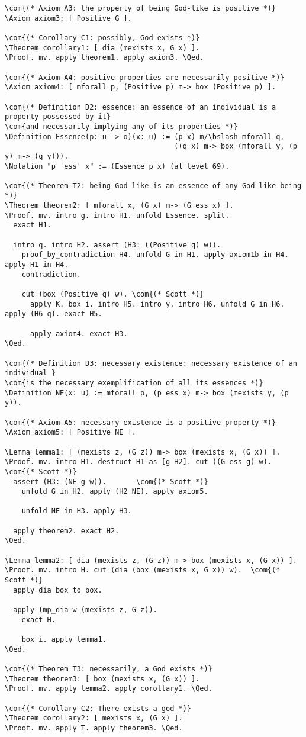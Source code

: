 \documentclass{llncs}
\newcommand{\red}[1]{\textcolor[rgb]{1,0,0}{#1}}
\newcommand{\blue}[1]{\textcolor[rgb]{0,0,1}{#1}}
\newcommand{\brown}[1]{\textcolor[rgb]{0.8,0.6,0.4}{#1}}
\newcommand{\Axiom}{\red{Axiom}}
\newcommand{\Lemma}{\red{Lemma}}
\newcommand{\Theorem}{\red{Theorem}}
\newcommand{\Definition}{\red{Definition}}
\newcommand{\Notation}{\blue{Notation}}
\newcommand{\Proof}{\blue{Proof}}
\newcommand{\Qed}{\blue{Qed}}
\newcommand{\com}[1]{\brown{#1}}
\newcommand{\bslash}{\symbol{92}}
\begin{document}
\begin{Verbatim}[commandchars=\\\{\},fontsize=\verbsize]
\com{(* Axiom A3: the property of being God-like is positive *)}
\Axiom axiom3: [ Positive G ].

\com{(* Corollary C1: possibly, God exists *)}
\Theorem corollary1: [ dia (mexists x, G x) ]. 
\Proof. mv. apply theorem1. apply axiom3. \Qed.

\com{(* Axiom A4: positive properties are necessarily positive *)}
\Axiom axiom4: [ mforall p, (Positive p) m-> box (Positive p) ].

\com{(* Definition D2: essence: an essence of an individual is a property possessed by it} 
\com{and necessarily implying any of its properties *)}
\Definition Essence(p: u -> o)(x: u) := (p x) m/\bslash mforall q, 
                                        ((q x) m-> box (mforall y, (p y) m-> (q y))).
\Notation "p 'ess' x" := (Essence p x) (at level 69).

\com{(* Theorem T2: being God-like is an essence of any God-like being *)}
\Theorem theorem2: [ mforall x, (G x) m-> (G ess x) ].
\Proof. mv. intro g. intro H1. unfold Essence. split.
  exact H1.

  intro q. intro H2. assert (H3: ((Positive q) w)).
    proof_by_contradiction H4. unfold G in H1. apply axiom1b in H4. apply H1 in H4. 
    contradiction. 

    cut (box (Positive q) w). \com{(* Scott *)}
      apply K. box_i. intro H5. intro y. intro H6. unfold G in H6. apply (H6 q). exact H5.

      apply axiom4. exact H3.
\Qed.

\com{(* Definition D3: necessary existence: necessary existence of an individual }
\com{is the necessary exemplification of all its essences *)}
\Definition NE(x: u) := mforall p, (p ess x) m-> box (mexists y, (p y)).

\com{(* Axiom A5: necessary existence is a positive property *)}
\Axiom axiom5: [ Positive NE ].

\Lemma lemma1: [ (mexists z, (G z)) m-> box (mexists x, (G x)) ].
\Proof. mv. intro H1. destruct H1 as [g H2]. cut ((G ess g) w). \com{(* Scott *)}
  assert (H3: (NE g w)).       \com{(* Scott *)}
    unfold G in H2. apply (H2 NE). apply axiom5.

    unfold NE in H3. apply H3.

  apply theorem2. exact H2.
\Qed.

\Lemma lemma2: [ dia (mexists z, (G z)) m-> box (mexists x, (G x)) ].
\Proof. mv. intro H. cut (dia (box (mexists x, G x)) w).  \com{(* Scott *)}
  apply dia_box_to_box.

  apply (mp_dia w (mexists z, G z)).
    exact H.
       
    box_i. apply lemma1.
\Qed.

\com{(* Theorem T3: necessarily, a God exists *)}
\Theorem theorem3: [ box (mexists x, (G x)) ].
\Proof. mv. apply lemma2. apply corollary1. \Qed.

\com{(* Corollary C2: There exists a god *)}
\Theorem corollary2: [ mexists x, (G x) ].
\Proof. mv. apply T. apply theorem3. \Qed.
\end{Verbatim}
\end{document}
